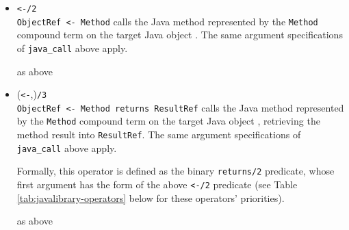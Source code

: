 \begin{itemize}
\item \verb|<-/2|\\
    \noindent\verb|ObjectRef <- Method| calls the Java method represented by the \texttt{Method} compound term on the target Java object . The same argument specifications of \texttt{java\_call} above apply.


    \exception{} as above

\item (\verb|<-|,)\texttt{/3}\\
    \noindent\verb|ObjectRef <- Method returns ResultRef| calls the Java method represented by the \texttt{Method} compound term on the target Java object , retrieving the method result into \texttt{ResultRef}. The same argument specifications of \texttt{java\_call} above apply.

    Formally, this operator is defined as the binary \texttt{returns/2} predicate, whose first argument has the form of the above \verb|<-/2| predicate (see Table \ref{tab:javalibrary-operators} below for these operators' priorities).


    \exception{} as above
\end{itemize}

